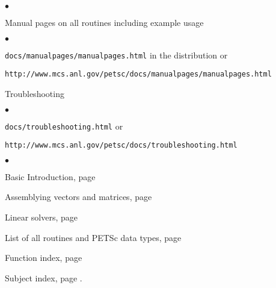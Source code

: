 \begin{list}{$\bullet$}
{
\setlength{\itemsep}{-.020in} 
\setlength{\topsep}{0in} 
\setlength{\partopsep}{0in}
}
\item Manual pages on all routines including example usage
\begin{list}{$\bullet$}
{
\setlength{\itemsep}{-.020in} 
\setlength{\topsep}{0in} 
\setlength{\partopsep}{0in}
}
   \item {\tt docs/manualpages/manualpages.html} in the distribution or 
   \item {\tt http://www.mcs.anl.gov/petsc/docs/manualpages/manualpages.html}
\end{list}
\item Troubleshooting
\begin{list}{$\bullet$}
{
\setlength{\itemsep}{-.020in} 
\setlength{\topsep}{0in} 
\setlength{\partopsep}{0in}
}
   \item {\tt docs/troubleshooting.html} or
   \item {\tt http://www.mcs.anl.gov/petsc/docs/troubleshooting.html}
\end{list}
\end{list}

\begin{list}{$\bullet$}
{
\setlength{\itemsep}{-.02in} 
\setlength{\topsep}{0in} 
\setlength{\partopsep}{0in}
}
\item Basic Introduction, page \pageref{sec:veccreate}
\item Assemblying vectors and matrices, page \pageref{chapter:matrices}
\item Linear solvers, page \pageref{ch:sles}
\item List of all routines and PETSc data types, page \pageref{routines}
\item Function index, page \pageref{findex}
\item Subject index, page \pageref{sindex}.
\end{list}

